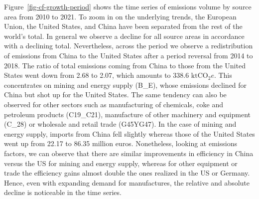 \documentclass[
  10pt,
  twocolumn]{aft}
\begin{document}
Figure~\ref{fig-cf-growth-period} shows the time series of emissions
volume by source area from 2010 to 2021. To zoom in on the underlying
trends, the European Union, the United States, and China have been
separated from the rest of the world's total. In general we observe a
decline for all source areas in accordance with a declining total.
Nevertheless, across the period we observe a redistribution of emissions
from China to the United States after a period reversal from 2014 to
2018. The ratio of total emissions coming from China to those from the
United States went down from 2.68 to 2.07, which amounts to 338.6
\(\text{ktCO}_2e\). This concentrates on mining and energy supply
(B\_E), whose emissions declined for China but shot up for the United
States. The same tendency can also be observed for other sectors such as
manufacturing of chemicals, coke and petroleum products (C19\_C21),
manufacture of other machinery and equipment (C\_28) or wholesale and
retail trade (G45YG47). In the case of mining and energy supply, imports
from China fell slightly whereas those of the United States went up from
22.17 to 86.35 million euros. Nonetheless, looking at emissions factors,
we can observe that there are similar improvements in efficiency in
China versus the US for mining and energy supply, whereas for other
equipment or trade the efficiency gains almost double the ones realized
in the US or Germany. Hence, even with expanding demand for
manufactures, the relative and absolute decline is noticeable in the
time series.
\end{document}
